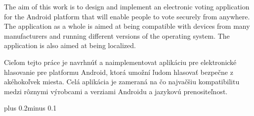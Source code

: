 \documentclass[11pt,twoside,a4paper]{book}
\begin{document}



 
\abstractpage

The aim of this work is to design and implement an electronic voting application for the Android platform that will enable people to vote securely from anywhere. The application as a whole is aimed at being compatible with devices from many manufacturers and running different versions of the operating system. The application is also aimed at being localized.




\baselineskip

\noindent
 Cieľom tejto práce je navrhnúť a naimplementovat aplikáciu pre elektronické hlasovanie pre platformu Android, ktorá umožní ľudom hlasovať bezpečne z akéhokoľvek miesta. Celá aplikácia je zameraná na čo najvačšiu kompatibilitu medzi rôznymi výrobcami a verziami Androidu a jazykovú prenositeľnost.
 


\tableofcontents



\listoffigures



\listoftables



\mainbodystarts
\normalfont
{}\baselineskip plus 0.2\baselineskip minus 0.1\baselineskip

\end{document}
